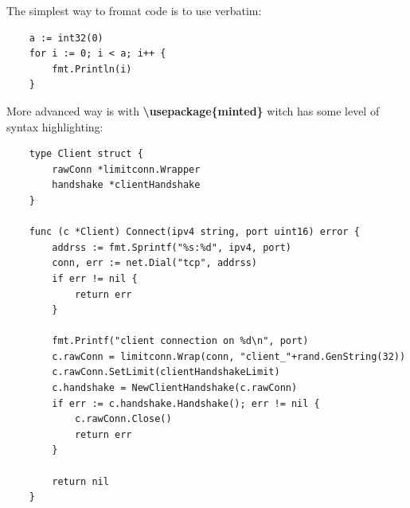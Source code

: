 \documentclass[12pt]{article}
\begin{document}
The simplest way to fromat code is to use verbatim:
\begin{verbatim}
    a := int32(0)
    for i := 0; i < a; i++ {
        fmt.Println(i)
    }
\end{verbatim}

\noindent More advanced way is with \textbf{\textbackslash usepackage\{minted\}} witch has some level of syntax highlighting:
\begin{verbatim}
    type Client struct {
        rawConn *limitconn.Wrapper
        handshake *clientHandshake
    }

    func (c *Client) Connect(ipv4 string, port uint16) error {
        addrss := fmt.Sprintf("%s:%d", ipv4, port)
        conn, err := net.Dial("tcp", addrss)
        if err != nil {
            return err
        }

        fmt.Printf("client connection on %d\n", port)
        c.rawConn = limitconn.Wrap(conn, "client_"+rand.GenString(32))
        c.rawConn.SetLimit(clientHandshakeLimit)
        c.handshake = NewClientHandshake(c.rawConn)
        if err := c.handshake.Handshake(); err != nil {
            c.rawConn.Close()
            return err
        }

        return nil
    }
\end{verbatim}

\newpage
\printbibliography
\end{document}
